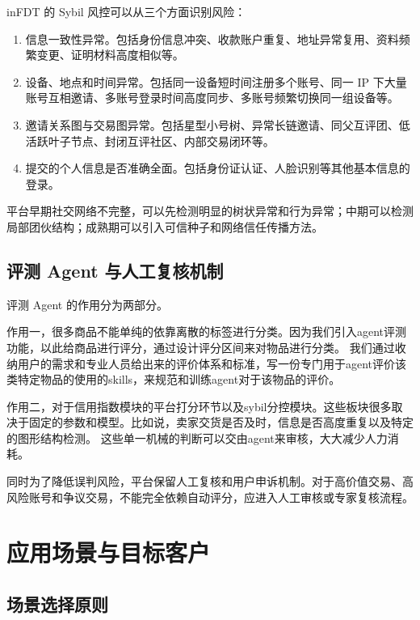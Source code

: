 \documentclass[UTF8,a4paper,12pt]{ctexart}
\begin{document}
inFDT 的 Sybil 风控可以从三个方面识别风险：

\begin{enumerate}
    \item 信息一致性异常。包括身份信息冲突、收款账户重复、地址异常复用、资料频繁变更、证明材料高度相似等。
    \item 设备、地点和时间异常。包括同一设备短时间注册多个账号、同一 IP 下大量账号互相邀请、多账号登录时间高度同步、多账号频繁切换同一组设备等。
    \item 邀请关系图与交易图异常。包括星型小号树、异常长链邀请、同父互评团、低活跃叶子节点、封闭互评社区、内部交易闭环等。
    \item 提交的个人信息是否准确全面。包括身份证认证、人脸识别等其他基本信息的登录。
\end{enumerate}

平台早期社交网络不完整，可以先检测明显的树状异常和行为异常；中期可以检测局部团伙结构；成熟期可以引入可信种子和网络信任传播方法。

\subsection{评测 Agent 与人工复核机制}


评测 Agent 的作用分为两部分。

作用一，很多商品不能单纯的依靠离散的标签进行分类。因为我们引入agent评测功能，以此给商品进行评分，通过设计评分区间来对物品进行分类。
我们通过收纳用户的需求和专业人员给出来的评价体系和标准，写一份专门用于agent评价该类特定物品的使用的skills，来规范和训练agent对于该物品的评价。

作用二，对于信用指数模块的平台打分环节以及sybil分控模块。这些板块很多取决于固定的参数和模型。比如说，卖家交货是否及时，信息是否高度重复以及特定的图形结构检测。
这些单一机械的判断可以交由agent来审核，大大减少人力消耗。


同时为了降低误判风险，平台保留人工复核和用户申诉机制。对于高价值交易、高风险账号和争议交易，不能完全依赖自动评分，应进入人工审核或专家复核流程。



\newpage
\section{应用场景与目标客户}

\subsection{场景选择原则}
\end{document}
